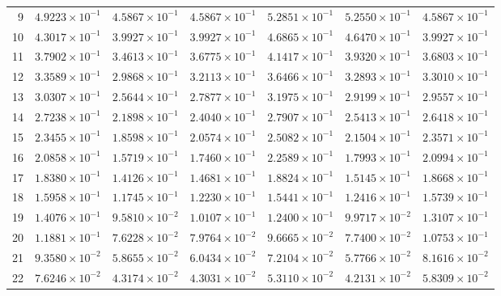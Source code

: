 \begin{table}[H]
\begin{tabular}{@{}rrrrrrr@{}}
9 & $4.9223\times10^{-1}$ & $4.5867\times10^{-1}$ & $4.5867\times10^{-1}$ & $5.2851\times10^{-1}$ & $5.2550\times10^{-1}$ & $4.5867\times10^{-1}$\\
10 & $4.3017\times10^{-1}$ & $3.9927\times10^{-1}$ & $3.9927\times10^{-1}$ & $4.6865\times10^{-1}$ & $4.6470\times10^{-1}$ & $3.9927\times10^{-1}$\\
11 & $3.7902\times10^{-1}$ & $3.4613\times10^{-1}$ & $3.6775\times10^{-1}$ & $4.1417\times10^{-1}$ & $3.9320\times10^{-1}$ & $3.6803\times10^{-1}$\\
12 & $3.3589\times10^{-1}$ & $2.9868\times10^{-1}$ & $3.2113\times10^{-1}$ & $3.6466\times10^{-1}$ & $3.2893\times10^{-1}$ & $3.3010\times10^{-1}$\\
13 & $3.0307\times10^{-1}$ & $2.5644\times10^{-1}$ & $2.7877\times10^{-1}$ & $3.1975\times10^{-1}$ & $2.9199\times10^{-1}$ & $2.9557\times10^{-1}$\\
14 & $2.7238\times10^{-1}$ & $2.1898\times10^{-1}$ & $2.4040\times10^{-1}$ & $2.7907\times10^{-1}$ & $2.5413\times10^{-1}$ & $2.6418\times10^{-1}$\\
15 & $2.3455\times10^{-1}$ & $1.8598\times10^{-1}$ & $2.0574\times10^{-1}$ & $2.5082\times10^{-1}$ & $2.1504\times10^{-1}$ & $2.3571\times10^{-1}$\\
16 & $2.0858\times10^{-1}$ & $1.5719\times10^{-1}$ & $1.7460\times10^{-1}$ & $2.2589\times10^{-1}$ & $1.7993\times10^{-1}$ & $2.0994\times10^{-1}$\\
17 & $1.8380\times10^{-1}$ & $1.4126\times10^{-1}$ & $1.4681\times10^{-1}$ & $1.8824\times10^{-1}$ & $1.5145\times10^{-1}$ & $1.8668\times10^{-1}$\\
18 & $1.5958\times10^{-1}$ & $1.1745\times10^{-1}$ & $1.2230\times10^{-1}$ & $1.5441\times10^{-1}$ & $1.2416\times10^{-1}$ & $1.5739\times10^{-1}$\\
19 & $1.4076\times10^{-1}$ & $9.5810\times10^{-2}$ & $1.0107\times10^{-1}$ & $1.2400\times10^{-1}$ & $9.9717\times10^{-2}$ & $1.3107\times10^{-1}$\\
20 & $1.1881\times10^{-1}$ & $7.6228\times10^{-2}$ & $7.9764\times10^{-2}$ & $9.6665\times10^{-2}$ & $7.7400\times10^{-2}$ & $1.0753\times10^{-1}$\\
21 & $9.3580\times10^{-2}$ & $5.8655\times10^{-2}$ & $6.0434\times10^{-2}$ & $7.2104\times10^{-2}$ & $5.7766\times10^{-2}$ & $8.1616\times10^{-2}$\\
22 & $7.6246\times10^{-2}$ & $4.3174\times10^{-2}$ & $4.3031\times10^{-2}$ & $5.3110\times10^{-2}$ & $4.2131\times10^{-2}$ & $5.8309\times10^{-2}$\\

\end{tabular}
\end{table}
